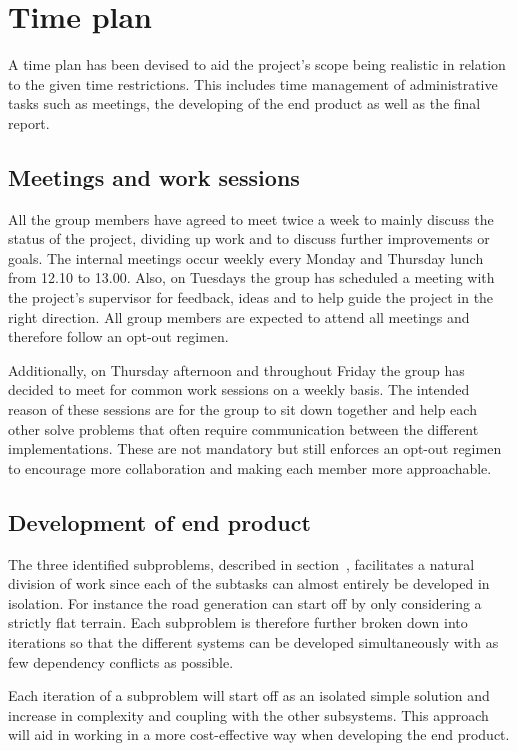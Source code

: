 \section{Time plan}
%

A time plan has been devised to aid the project's scope being realistic in relation to the given time restrictions.
This includes time management of administrative tasks such as meetings, the developing of the end product as well as the final report.

\subsection{Meetings and work sessions}
All the group members have agreed to meet twice a week to mainly discuss the status of the project, dividing up work and to discuss further improvements or goals.
The internal meetings occur weekly every Monday and Thursday lunch from 12.10 to 13.00.
Also, on Tuesdays the group has scheduled a meeting with the project's supervisor for feedback, ideas and to help guide the project in the right direction.
All group members are expected to attend all meetings and therefore follow an opt-out regimen.

Additionally, on Thursday afternoon and throughout Friday the group has decided to meet for common work sessions on a weekly basis.
The intended reason of these sessions are for the group to sit down together and help each other solve problems that often require communication between the different implementations.
These are not mandatory but still enforces an opt-out regimen to encourage more collaboration and making each member more approachable.

\subsection{Development of end product}
The three identified subproblems, described in section~, facilitates a natural division of work since each of the subtasks can almost entirely be developed in isolation.
For instance the road generation can start off by only considering a strictly flat terrain.
Each subproblem is therefore further broken down into iterations so that the different systems can be developed simultaneously with as few dependency conflicts as possible.

Each iteration of a subproblem will start off as an isolated simple solution and increase in complexity and coupling with the other subsystems.
This approach will aid in working in a more cost-effective way when developing the end product.

